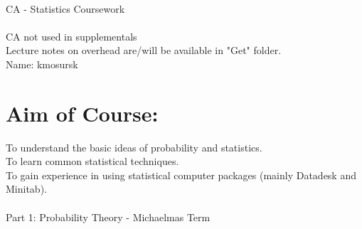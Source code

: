 \documentclass[a4paper,12pt]{article}
\begin{document}
\\

CA - Statistics Coursework \\

\\

CA not used in supplementals \\

Lecture notes on overhead are/will be available in "Get" folder. \\

Name: kmosursk 

\section{Aim of Course:}

To understand the basic ideas of probability and statistics. \\

To learn common statistical techniques. \\

To gain experience in using statistical computer packages (mainly Datadesk and Minitab). \\

\\

Part 1: Probability Theory - Michaelmas Term
\end{document}
